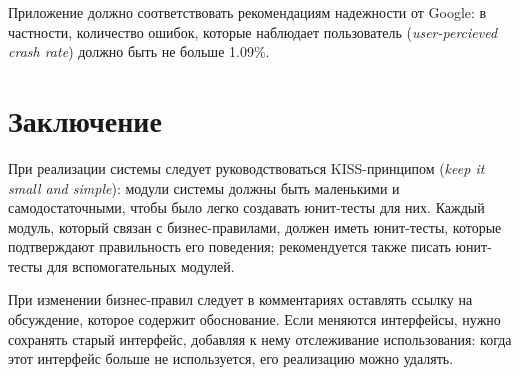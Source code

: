 \documentclass[a4page]{article}
\begin{document}
Приложение должно соответствовать рекомендациям надежности от Google:
в частности, количество ошибок, которые наблюдает пользователь (\textit{user-percieved crash rate}) должно быть не больше 1.09\%. 

\newpage
\section{Заключение}

При реализации системы следует руководствоваться KISS-принципом (\textit{keep it small and simple}):
модули системы должны быть маленькими и самодостаточными,
чтобы было легко создавать юнит-тесты для них.
Каждый модуль, который связан с бизнес-правилами, должен иметь юнит-тесты,
которые подтверждают правильность его поведения;
рекомендуется также писать юнит-тесты для вспомогательных модулей.

При изменении бизнес-правил следует в комментариях оставлять ссылку на обсуждение,
которое содержит обоснование.
Если меняются интерфейсы, нужно сохранять старый интерфейс,
добавляя к нему отслеживание использования:
когда этот интерфейс больше не используется, его реализацию можно удалять.
\end{document}
